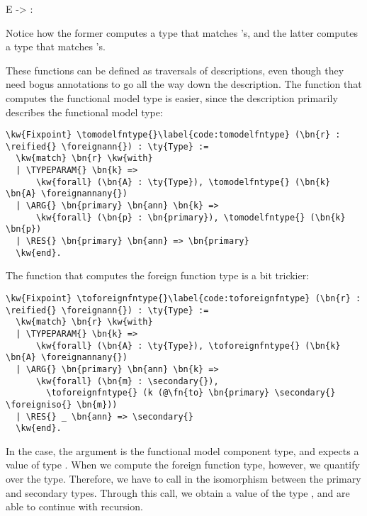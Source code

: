 \begin{SaveVerbatim}{E}
 ->  : 
\end{SaveVerbatim}

Notice how the former computes a type that matches 's, and the latter computes a type that matches 's. 

These functions can be defined as traversals of \reified{} descriptions, even though they need bogus annotations to go all the way down the description. The \tomodelfntype{} function that computes the \gls{functional model} type is easier, since the \reified{} description primarily describes the \gls{functional model} type:

\begin{Verbatim}
\kw{Fixpoint} \tomodelfntype{}\label{code:tomodelfntype} (\bn{r} : \reified{} \foreignann{}) : \ty{Type} :=
  \kw{match} \bn{r} \kw{with}
  | \TYPEPARAM{} \bn{k} =>
      \kw{forall} (\bn{A} : \ty{Type}), \tomodelfntype{} (\bn{k} \bn{A} \foreignannany{})
  | \ARG{} \bn{primary} \bn{ann} \bn{k} => 
      \kw{forall} (\bn{p} : \bn{primary}), \tomodelfntype{} (\bn{k} \bn{p})
  | \RES{} \bn{primary} \bn{ann} => \bn{primary}
  \kw{end}.
\end{Verbatim}

The \toforeignfntype{} function that computes the \gls{foreign function} type is a bit trickier:

\begin{Verbatim}
\kw{Fixpoint} \toforeignfntype{}\label{code:toforeignfntype} (\bn{r} : \reified{} \foreignann{}) : \ty{Type} :=
  \kw{match} \bn{r} \kw{with}
  | \TYPEPARAM{} \bn{k} =>
      \kw{forall} (\bn{A} : \ty{Type}), \toforeignfntype{} (\bn{k} \bn{A} \foreignannany{})
  | \ARG{} \bn{primary} \bn{ann} \bn{k} =>
      \kw{forall} (\bn{m} : \secondary{}),
        \toforeignfntype{} (k (@\fn{to} \bn{primary} \secondary{} \foreigniso{} \bn{m}))
  | \RES{} _ \bn{ann} => \secondary{}
  \kw{end}.
\end{Verbatim}

In the \ARG{} case, the  argument is the \gls{functional model} component type, and  expects a value of type . When we compute the \gls{foreign function} type, however, we quantify over the  type. Therefore, we have to call \toiso{} in the isomorphism between the primary and secondary types. Through this call, we obtain a value of the type , and are able to continue with recursion.

